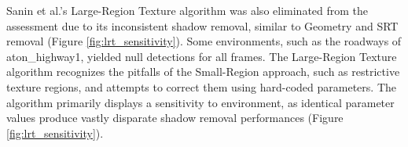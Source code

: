 
Sanin et al.'s Large-Region Texture algorithm was also eliminated from the assessment due to its inconsistent shadow removal, similar to Geometry and SRT removal (Figure \ref{fig:lrt_sensitivity}). Some environments, such as the roadways of aton\_highway1, yielded null detections for all frames. The Large-Region Texture algorithm recognizes the pitfalls of the Small-Region approach, such as restrictive texture regions, and attempts to correct them using hard-coded parameters. The algorithm primarily displays a sensitivity to environment, as identical parameter values produce vastly disparate shadow removal performances (Figure \ref{fig:lrt_sensitivity}). 

